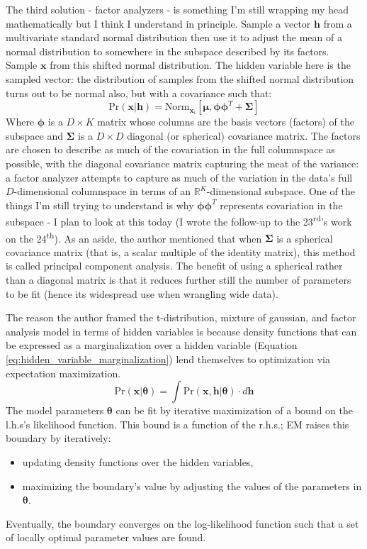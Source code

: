 \documentclass[idxtotoc,hyperref,openany]{labbook} %
\begin{document}
 The third solution - factor analyzers - is something I'm still wrapping my head mathematically but I think I understand in principle. Sample a vector $\mathbf{h}$ from a multivariate standard normal distribution then use it to adjust the mean of a normal distribution to somewhere in the subspace described by its factors. Sample $\mathbf{x}$ from this shifted normal distribution. The hidden variable here is the sampled vector: the distribution of samples from the shifted normal distribution turns out to be normal also, but with a covariance such that:
 \[
 	\text{Pr}(\mathbf{x}|\mathbf{h}) = \text{Norm}_{\mathbf{x}_i}[\mathbf{\mu}, \mathbf{\phi\phi}^T + \mathbf{\Sigma}]
 \]
 Where $\mathbf{\phi}$ is a $D \times K$ matrix whose columns are the basis vectors (factors) of the subspace and $\mathbf{\Sigma}$ is a $D \times D$ diagonal (or spherical) covariance matrix. The factors are chosen to describe as much of the covariation in the full columnspace as possible, with the diagonal covariance matrix capturing the meat of the variance: a factor analyzer attempts to capture as much of the variation in the data's full $D$-dimensional columnspace in terms of an $\mathbb{R}^K$-dimensional subspace. One of the things I'm still trying to understand is why $\mathbf{\phi}\mathbf{\phi}^T$ represents covariation in the subspace - I plan to look at this today (I wrote the follow-up to the 23\textsuperscript{rd}'s work on the 24\textsuperscript{th}). As an aside, the author mentioned that when $\mathbf{\Sigma}$ is a spherical covariance matrix (that is, a scalar multiple of the identity matrix), this method is called principal component analysis. The benefit of using a spherical rather than a diagonal matrix is that it reduces further still the number of parameters to be fit (hence its widespread use when wrangling wide data).
 
 The reason the author framed the t-distribution, mixture of gaussian, and factor analysis model in terms of hidden variables is because density functions that can be expressed as a marginalization over a hidden variable (Equation \ref{eq:hidden_variable_marginalization}) lend themselves to optimization via expectation maximization.
 \[
 	\text{Pr}(\mathbf{x|\mathbf{\theta}}) = \int\text{Pr}(\mathbf{x}, \mathbf{h}|\mathbf{\theta})\cdot d\mathbf{h}\label{eq:hidden_variable_marginalization}
 \]
 The model parameters $\mathbf{\theta}$ can be fit by iterative maximization of a bound on the l.h.s's likelihood function. This bound is a function of the r.h.s.; EM raises this boundary by iteratively:
 \begin{itemize}
 \item updating density functions over the hidden variables,
 \item maximizing the boundary's value by adjusting the values of the parameters in $\mathbf{\theta}$.
 \end{itemize}
 Eventually, the boundary converges on the log-likelihood function such that a set of locally optimal parameter values are found.
 
\end{document}
